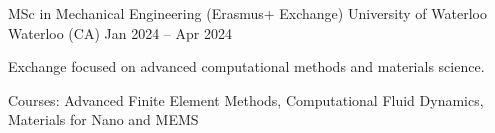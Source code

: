 
\cventry
{MSc in Mechanical Engineering (Erasmus+ Exchange)}
{University of Waterloo}
{Waterloo (CA)}
{Jan 2024 -- Apr 2024}
{
    \begin{cvitems}
        \ifdefined\IsCV
            \item {Exchange focused on advanced computational methods and materials science.}
        \fi
        \item {Courses: Advanced Finite Element Methods, Computational Fluid Dynamics, Materials for Nano and MEMS}
    \end{cvitems}
}